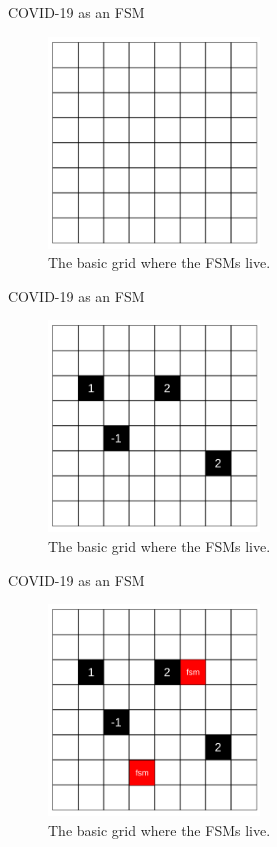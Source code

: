 \documentclass{beamer}
\begin{document}
\begin{frame}{COVID-19 as an FSM}
\begin{figure}
\centering
\includegraphics[width=0.5\textwidth]{figures/grid.pdf}
\caption{\label{fig:grid1} The basic grid where the FSMs live.}
\end{figure}
\end{frame}

\begin{frame}{COVID-19 as an FSM}
\begin{figure}
\centering
\includegraphics[width=0.5\textwidth]{figures/grid_food.pdf}
\caption{\label{fig:grid2} The basic grid where the FSMs live.}
\end{figure}
\end{frame}

\begin{frame}{COVID-19 as an FSM}
\begin{figure}
\centering
\includegraphics[width=0.5\textwidth]{figures/grid_food_fsm.pdf}
\caption{\label{fig:grid3} The basic grid where the FSMs live.}
\end{figure}
\end{frame}
\end{document}
